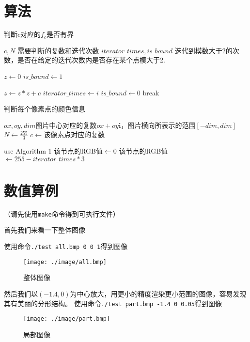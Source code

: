 \documentclass{article}
\begin{document}
\section{算法}
\begin{algorithm}  [H]
     \caption{判断$c$对应的$f_c$是否有界}  
     \begin{algorithmic}[1] %
         \Require   $c,N$ 需要判断的复数和迭代次数
         \Ensure   $iterator\_times,is\_bound$ 迭代到模数大于2的次数，是否在给定的迭代次数内是否存在某个点模大于2.
         
         \State $z \gets 0$
         \State $is\_bound \gets 1$
          
               \State $z \gets z*z+c$
                 \State $iterator\_times \gets i$
                 \State $is\_bound \gets 0$
                 \State break
               \EndIf
         \EndFor

     \end{algorithmic}  
 \end{algorithm}  
 \begin{algorithm}  [H]
     \caption{判断每个像素点的颜色信息}  
     \begin{algorithmic}[1] %
         \Require   $ox,oy,dim$图片中心对应的复数$ox+oy\textbf{i}$，图片横向所表示的范围$[-dim,dim]$ 
         \State $N\gets \frac{255}{3}$
               \State $c \gets $该像素点对应的复数
               
               \State use Algorithm 1
                    \State 该节点的RGB值$\gets 0$
               \Else
                    \State 该节点的RGB值$\gets 255-iterator\_times*3$
               \EndIf
         \EndFor

     \end{algorithmic}  
 \end{algorithm}  
\section{数值算例}
（请先使用\verb|make|命令得到可执行文件）

首先我们来看一下整体图像

使用命令\verb|./test all.bmp 0 0 1|得到图像
\begin{figure}[H]
     \centering
     \texttt{[image: ./image/all.bmp]}
     \caption{整体图像}
\end{figure}
然后我们以$(-1.4,0)$为中心放大，用更小的精度渲染更小范围的图像，容易发现其有美丽的分形结构。
使用命令\verb|./test part.bmp -1.4 0 0.05|得到图像
\begin{figure}[H]
     \centering
     \texttt{[image: ./image/part.bmp]}
     \caption{局部图像}
\end{figure}
\end{document}

